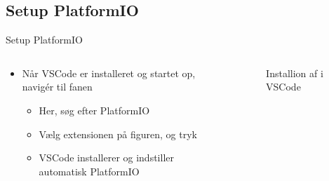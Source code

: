 \documentclass[aspectratio=169]{beamer}
\begin{document}
\subsection{Setup PlatformIO}
\begin{frame}{Setup PlatformIO}
\begin{columns}
	\begin{column}{0.5\textwidth}
		\begin{textBox}
			\begin{itemize}
				\item Når VSCode er installeret og startet op, navigér til  fanen
				\begin{itemize}
					\item Her, søg efter PlatformIO
					\item Vælg extensionen på figuren, og tryk 
					\item VSCode installerer og indstiller automatisk PlatformIO
				\end{itemize}
			\end{itemize}
		\end{textBox}
	\end{column}
	\begin{column}{0.5\textwidth}
		\begin{figure}
  			\caption{Installion af  i VSCode}
  			\label{fig:pio-dl}
		\end{figure}
	\end{column}
\end{columns}
\end{frame}
\end{document}
